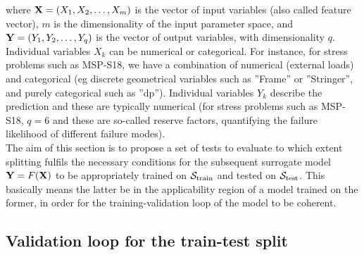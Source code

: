 where ${\bf X}=(X_1,X_2,\dots,X_m)$ is the vector of input variables (also called feature vector), $m$ is the dimensionality of the input parameter space, and ${\bf Y}=(Y_1,Y_2,\dots,Y_q)$ is the vector of output variables, with dimensionality $q$. Individual variables $X_k$ can be numerical or categorical. For instance, for stress problems such as MSP-S18, we have a combination of numerical  (\eg external loads) and categorical (eg discrete geometrical variables such as ''Frame'' or ''Stringer'', and purely categorical such as ''dp''). Individual variables $Y_k$ describe the prediction and these are typically numerical (for stress problems such as MSP-S18, $q=6$ and these are so-called reserve factors, quantifying the failure likelihood of different failure modes).\\
%
\indent The aim of this section is to propose a set of tests to evaluate to which extent splitting fulfils the necessary conditions for the subsequent surrogate model ${\bf {Y}}={F}({\bf X})$ to be appropriately trained on ${\cal S}_{\text{train}}$ and tested on ${\cal S}_{\text{test}}$. This basically means the latter be in the applicability region of a model trained on the former, in order for the training-validation loop of the model to be coherent.\\
%
\subsection{Validation loop for the train-test split}

